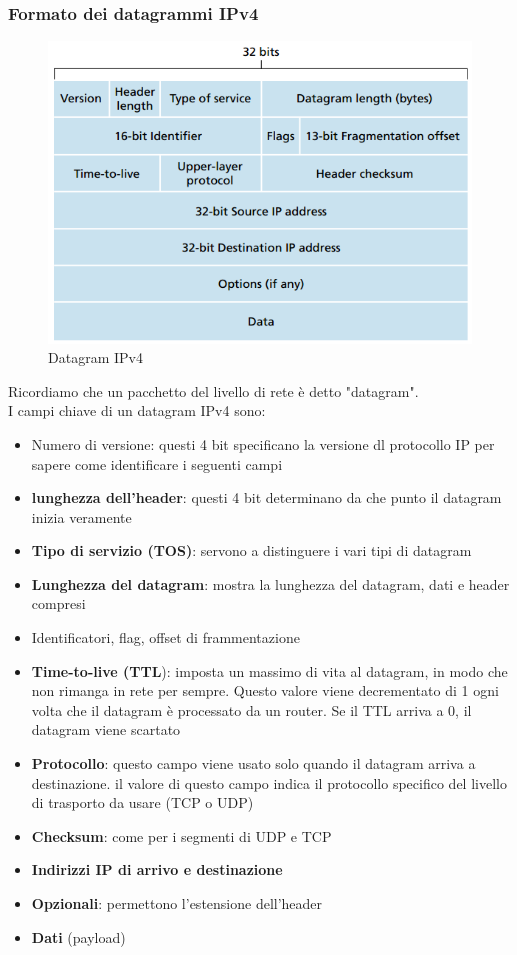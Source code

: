 \documentclass[11pt,a4paper]{article}
\begin{document}
\subsubsection{Formato dei datagrammi IPv4}
\begin{figure}
	\begin{center}
		\includegraphics[scale=0.6]{img/052.png}
		\caption{Datagram IPv4}
	\end{center}
\end{figure}
Ricordiamo che un pacchetto del livello di rete è detto "datagram". \\
I campi chiave di un datagram IPv4 sono:
\begin{itemize}
	\item Numero di versione: questi 4 bit specificano la versione dl protocollo IP per sapere come identificare i seguenti campi
	\item \textbf{lunghezza dell'header}: questi 4 bit determinano da che punto il datagram inizia veramente
	\item \textbf{Tipo di servizio (TOS)}: servono a distinguere i vari tipi di datagram
	\item\textbf{ Lunghezza del datagram}: mostra la lunghezza del datagram, dati e header compresi
	\item Identificatori, flag, offset di frammentazione
	\item \textbf{Time-to-live (TTL}): imposta un massimo di vita al datagram, in modo che non rimanga in rete per sempre. Questo valore viene decrementato di 1 ogni volta che il datagram è processato da un router. Se il TTL arriva a 0, il datagram viene scartato
	\item \textbf{Protocollo}: questo campo viene usato solo quando il datagram arriva a destinazione. il valore di questo campo indica il protocollo specifico del livello di trasporto da usare (TCP o UDP)
	\item \textbf{Checksum}: come per i segmenti di UDP e TCP
	\item \textbf{Indirizzi IP di arrivo e destinazione}
	\item \textbf{Opzionali}: permettono l'estensione dell'header
	\item \textbf{Dati} (payload)
\end{itemize}
\end{document}
